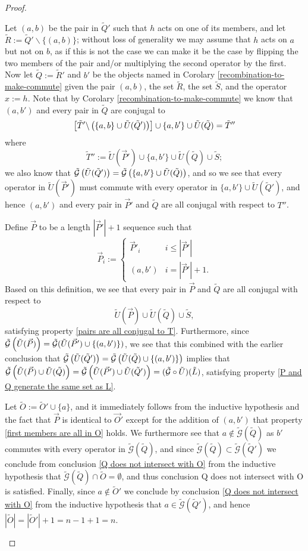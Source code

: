 \documentclass[twocolumn,showpacs,preprintnumbers,amsmath,amssymb,nofootinbib,pra,floatfix]{revtex4-1}
\newcommand{\lst}{\vec}
\newcommand{\set}{\tilde}
\newcommand{\genfun}{\tilde{\mathcal{G}}}
\begin{document}
\begin{proof}
\begin{description}
Let $(a,b)$ be the pair in $\set Q'$ such that $h$ acts on one of its members, and let $\set R:=\set Q'\backslash\{(a,b)\}$;  without loss of generality we may assume that $h$ acts on $a$ but not on $b$, as if this is not the case we can make it be the case by flipping the two members of the pair and/or multiplying the second operator by the first.  Now let $\set Q:=\set R'$ and $b'$ be the objects named in Corolary \ref{recombination-to-make-commute} given the pair $(a,b)$, the set $\set R$, the set $\set S$, and the operator $x:=h$.  Note that by Corolary \ref{recombination-to-make-commute} we know that $(a,b')$ and every pair in $\set Q$ are conjugal to
$$\left[\set T'\backslash\paren{\{a,b\} \cup \set U(\set Q')}\right]\cup \{a,b'\} \cup \set U(\set Q)=\set T''$$
where
$$\set T'':=\set U(\lst P')\cup \{a,b'\} \cup \set U(\set Q)\cup \set S;$$
we also know that $\genfun\paren{\set U(\set Q')}=\genfun\paren{\{a,b'\}\cup \set U(\set Q)}$, and so we see that every operator in $\set U(\lst P')$ must commute with every operator in $\{a,b'\}\cup \set U(\set Q')$, and hence $(a,b')$ and every pair in $\lst P'$ and $\set Q$ are all conjugal with respect to $T''$.

Define $\lst P$ to be a length $|\lst P'|+1$ sequence such that
$$
\lst P_i :=
\begin{cases}
\lst P'_i & i \le |\lst P'| \\
(a,b') & i = |\lst P'|+1.
\end{cases}
$$
Based on this definition, we see that every pair in $\lst P$ and $\set Q$ are all conjugal with respect to $$\set U(\lst P) \cup \set U(\set Q)\cup \set S,$$ satisfying property \ref{pairs are all conjugal to T}.  Furthermore, since  $\genfun\paren{\set U(\lst P)} = \genfun(\set U(\lst P')\cup\{(a,b')\})$, we see that this combined with the earlier conclusion that $\genfun\paren{\set U(\set Q')}=\genfun\paren{\set U(\set Q)\cup\{(a,b')\}}$ implies that $\genfun\paren{\set U(\lst P)\cup \set U(\set Q)}=\genfun\paren{\set U(\lst P')\cup \set U(\set Q')}=(\genfun\circ\set U)(\set L)$, satisfying property \ref{P and Q generate the same set as L}.

Let $\set O := \set O'\cup\{a\}$, and it immediately follows from the inductive hypothesis and the fact that $\lst P$ is identical to $\lst O'$ except for the addition of $(a,b')$ that property \ref{first members are all in O} holds.  We furthermore see that $a\notin \genfun(\set Q)$ as $b'$ commutes with every operator in $\genfun(\set Q)$, and since $\genfun(\set Q)\subset\genfun(\set Q')$ we conclude from conclusion \ref{Q does not intersect with O} from the inductive hypothesis that $\genfun(\set Q)\cap\set O=\emptyset$, and thus conclusion {Q does not intersect with O} is satisfied.  Finally, since $a\notin \set O'$ we conclude by conclusion \ref{Q does not intersect with O} from the inductive hypothesis that $a\in\genfun(\set Q')$, and hence $|\set O|=|\set O'|+1=n-1+1=n$.


\end{description}
\end{proof}
\end{document}
